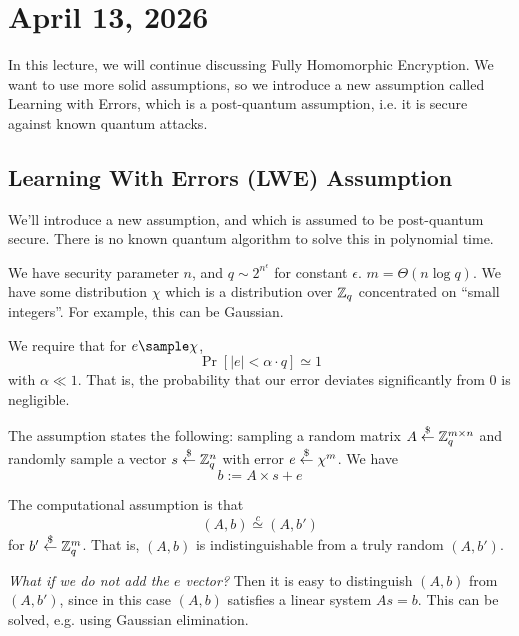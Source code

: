 \section{April 13, 2026}
\label{20260413}

In this lecture, we will continue discussing Fully Homomorphic Encryption. We want to use more solid assumptions, so we introduce a new assumption called Learning with Errors, which is a post-quantum assumption, i.e. it is secure against known quantum attacks.

\subsection{Learning With Errors (LWE) Assumption}
We'll introduce a new assumption, and which is assumed to be post-quantum secure. There is no known quantum algorithm to solve this in polynomial time.

We have security parameter $n$, and $q\sim 2^{n^\epsilon}$ for constant $\epsilon$. $m = \Theta(n\log q)$. We have some distribution $\chi$ which is a distribution over $\mathbb Z_q$ concentrated on ``small integers''. For example, this can be Gaussian.

\begin{center}
\def\svgwidth{0.5\columnwidth}

\end{center}

We require that for $e\sample \chi$, 
\[\Pr[|e| < \alpha\cdot q ]\simeq 1\]
with $\alpha \ll 1$. That is, the probability that our error deviates significantly from $0$ is negligible.

The assumption states the following: sampling a random matrix $A\overset{\$}{\leftarrow} \mathbb Z_q^{m\times n}$ and randomly sample a vector $s\overset{\$}{\leftarrow} \mathbb Z_q^n$ with error $e\overset{\$}{\leftarrow} \chi^m$. We have \[b:=A\times s + e\]

The computational assumption is that
\[(A, b)\overset{c}{\simeq} (A, b')\]
for $b'\overset{\$}{\leftarrow} \mathbb Z_q^m$. That is, $(A, b)$ is indistinguishable from a truly random $(A, b')$.

\begin{center}
    \def\svgwidth{0.5\columnwidth}
    
\end{center}

\begin{remark}
    \textit{What if we do not add the $e$ vector?} Then it is easy to distinguish $(A, b)$ from $(A, b')$, since in this case $(A, b)$ satisfies a linear system $As = b$. This can be solved, e.g. using Gaussian elimination.
\end{remark}

